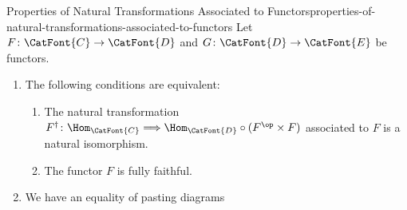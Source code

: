 \begin{proposition}{Properties of Natural Transformations Associated to Functors}{properties-of-natural-transformations-associated-to-functors}%
    Let $F\colon\CatFont{C}\to\CatFont{D}$ and $G\colon\CatFont{D}\to\CatFont{E}$ be functors.
    \begin{enumerate}
        \item\label{properties-of-natural-transformations-associated-to-functors-interaction-with-natural-isomorphisms}The following conditions are equivalent:
            \begin{enumerate}
                \item\label{properties-of-natural-transformations-associated-to-functors-interaction-with-natural-isomorphisms-a}The natural transformation $F^{\dagger}\colon\Hom_{\CatFont{C}}\Longrightarrow{\Hom_{\CatFont{D}}}\circ{(F^{\op}\times F)}$ associated to $F$ is a natural isomorphism.
                \item\label{properties-of-natural-transformations-associated-to-functors-interaction-with-natural-isomorphisms-b}The functor $F$ is fully faithful.
            \end{enumerate}
        \item\label{properties-of-natural-transformations-associated-to-functors-interaction-with-composition}We have an equality of pasting diagrams
            \begin{scalemath}
\end{scalemath}
\end{enumerate}
\end{proposition}
